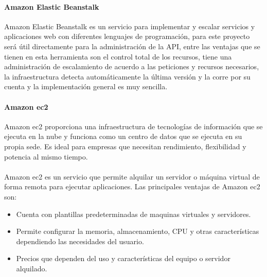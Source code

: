 \documentclass[12pt, a4paper, titlepage]{report}
\begin{document}
		   	\paragraph{Amazon Elastic Beanstalk \\}	
		   	Amazon Elastic Beanstalk \cite{amazon_elastic_beanstalk} es un servicio para implementar y escalar servicios y aplicaciones web con diferentes lenguajes de programación, para este proyecto será útil directamente para la administración de la API, entre las ventajas que se tienen en esta herramienta son el control total de los recursos, tiene una administración de escalamiento de acuerdo a las peticiones y recursos necesarios, la infraestructura detecta automáticamente la última versión y la corre por su cuenta y la implementación general es muy sencilla.

		   	\paragraph{Amazon \acrshort{ec2} \\}
		   	Amazon \acrfull{ec2} \cite{amazon_ec2} proporciona una infraestructura de tecnologías de información que se ejecuta en la nube y funciona como un centro de datos que se ejecuta en su propia sede. Es ideal para empresas que necesitan rendimiento, flexibilidad y potencia al mismo tiempo.\\\\
		   	Amazon \acrshort{ec2} es un servicio que permite alquilar un servidor o máquina virtual de forma remota para ejecutar aplicaciones.	
		   	Las principales ventajas de Amazon \acrshort{ec2} son: 
		   	\begin{itemize}
		   		\item Cuenta con plantillas predeterminadas de maquinas virtuales y servidores.
		   		\item Permite configurar la memoria, almacenamiento, CPU y otras características dependiendo las necesidades del usuario.
		   		\item Precios que dependen del uso y características del equipo o servidor alquilado.
		   	\end{itemize}
		   	
\end{document}

